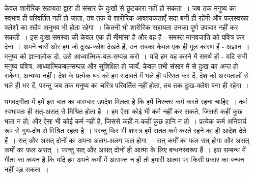 केवल शारीरिक सहायता द्वारा ही संसार के दुःखों से छुटकारा नहीं हो सकता~। जब तक मनुष्य का स्वभाव ही परिवर्तित नहीं हो जाता, तब तक ये शारीरिक आवश्यकताएँ सदा बनी ही रहेंगी और फलस्वरूप क्लेशों का सदैव अनुभव भी होता रहेगा~। कितनी भी शारीरिक सहायता उनका पूर्ण उपचार नहीं कर सकती~। इस दुःख-समस्या की केवल एक ही मीमांसा है और वह है - समस्त मानवजाति को पवित्र कर देना~। अपने चारों ओर हम जो दुःख-क्लेश देखते हैं, उन सबका केवल एक ही मूल कारण हैं - अज्ञान~। मनुष्य को ज्ञानालोक दो, उसे आध्यात्मिक-बल-सम्पन्न करो~। यदि हम यह करने में समर्थ हों - यदि सभी मनुष्य पवित्र, आध्यात्मिकबलसम्पन्न और सुशिक्षित हो जायँ, केवल तभी संसार में से दुःख का अन्त हो सकेगा, अन्यथा नहीं। देश के प्रत्येक घर को हम सदावर्त में भले ही परिणत कर दें, देश को अस्पतालों से भले ही भर दें, परन्तु जब तक मनुष्य का चरित्र परिवर्तित नहीं होता, तब तक दुःख-क्लेश बना ही रहेगा~।

\newpage

भगवद्गीता में हमें इस बात का बारम्बार उपदेश मिलता है कि हमें निरन्तर कर्म करते रहना चाहिए~। कर्म स्वभावतः ही सत्-असत् से मिश्रित होता है~। हम ऐसा कोई भी कर्म नहीं कर सकते, जिससे कहीं कुछ भला न हो; और ऐसा भी कोई कर्म नहीं है, जिससे कहीं-न-कहीं कुछ हानि न हो~। प्रत्येक कर्म अनिवार्य रूप से गुण-दोष से मिश्रित रहता है~। परन्तु फिर भी शास्त्र हमें सतत कर्म करते रहने का ही आदेश देते हैं~। सत् और असत् दोनों का अपना अलग-अलग फल होगा~। सत् कर्मों का फल सत् होगा और असत् कर्मों का फल असत्~। परन्तु सत् और असत् दोनों ही आत्मा के लिए बन्धनस्वरूप हैं~। इस सम्बन्ध में गीता का कथन है कि यदि हम अपने कर्मों में आसक्त न हों तो हमारी आत्मा पर किसी प्रकार का बन्धन नहीं पड़ सकता~।

